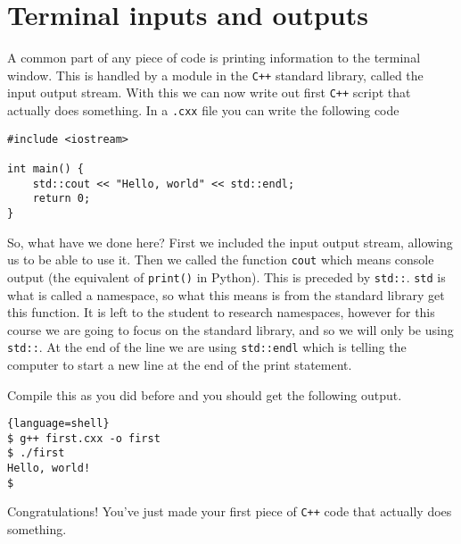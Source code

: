\section{Terminal inputs and outputs}
A common part of any piece of code is printing information to the terminal window.
This is handled by a module in the \texttt{C++} standard library, called the input output stream.
With this we can now write out first \texttt{C++} script that actually does something.
In a \texttt{.cxx} file you can write the following code 
\lstset{style=mystyle}
\begin{lstlisting}
#include <iostream>

int main() {
	std::cout << "Hello, world" << std::endl;
	return 0;
}
\end{lstlisting}
So, what have we done here?
First we included the input output stream, allowing us to be able to use it.
Then we called the function \texttt{cout} which means console output (the equivalent of \texttt{print()} in Python). 
This is preceded by \texttt{std::}. 
\texttt{std} is what is called a namespace, so what this means is from the standard library get this function. 
It is left to the student to research namespaces, however for this course we are going to focus on the standard library, and so we will only be using \texttt{std::}.   
At the end of the line we are using \texttt{std::endl} which is telling the computer to start a new line at the end of the print statement. 

Compile this as you did before and you should get the following output.
\begin{lstlisting}{language=shell}
$ g++ first.cxx -o first
$ ./first
Hello, world!
$
\end{lstlisting}
Congratulations! 
You've just made your first piece of \texttt{C++} code that actually does something.

